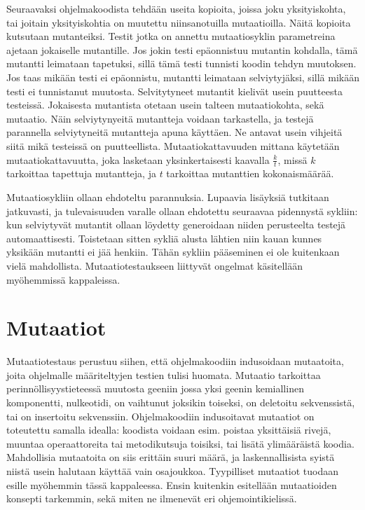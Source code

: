 \documentclass{tktltiki}
\begin{document}
Seuraavaksi ohjelmakoodista tehdään useita kopioita, joissa joku yksityiskohta, tai joitain yksityiskohtia on muutettu niinsanotuilla mutaatioilla. Näitä kopioita kutsutaan mutanteiksi. Testit jotka on annettu mutaatiosyklin parametreina ajetaan jokaiselle mutantille. Jos jokin testi epäonnistuu mutantin kohdalla, tämä mutantti leimataan tapetuksi, sillä tämä testi tunnisti koodin tehdyn muutoksen. Jos taas mikään testi ei epäonnistu, mutantti leimataan selviytyjäksi, sillä mikään testi ei tunnistanut muutosta. Selvitytyneet mutantit kielivät usein puutteesta testeissä. Jokaisesta mutantista otetaan usein talteen mutaatiokohta, sekä mutaatio. Näin selviytynyeitä mutantteja voidaan tarkastella, ja testejä parannella selviytyneitä mutantteja apuna käyttäen. Ne antavat usein vihjeitä siitä mikä testeissä on puutteellista. Mutaatiokattavuuden mittana käytetään mutaatiokattavuutta, joka lasketaan yksinkertaisesti kaavalla $\frac{k}{t}$, missä $k$ tarkoittaa tapettuja mutantteja, ja $t$ tarkoittaa mutanttien kokonaismäärää.

Mutaatiosykliin ollaan ehdoteltu parannuksia. Lupaavia lisäyksiä tutkitaan jatkuvasti, ja tulevaisuuden varalle ollaan ehdotettu seuraavaa pidennystä sykliin: kun selviytyvät mutantit ollaan löydetty generoidaan niiden perusteelta testejä automaattisesti. Toistetaan sitten sykliä alusta lähtien niin kauan kunnes yksikään mutantti ei jää henkiin. Tähän sykliin pääseminen ei ole kuitenkaan vielä mahdollista. Mutaatiotestaukseen liittyvät ongelmat käsitellään myöhemmissä kappaleissa.

\section{Mutaatiot}
Mutaatiotestaus perustuu siihen, että ohjelmakoodiin indusoidaan mutaatoita, joita ohjelmalle määriteltyjen testien tulisi huomata. Mutaatio tarkoittaa perinnöllisyystieteessä muutosta geeniin jossa yksi geenin kemiallinen komponentti, nulkeotidi, on vaihtunut joksikin toiseksi, on deletoitu sekvenssistä, tai on insertoitu sekvenssiin. Ohjelmakoodiin indusoitavat mutaatiot on toteutettu samalla idealla: koodista voidaan esim. poistaa yksittäisiä rivejä, muuntaa operaattoreita tai metodikutsuja toisiksi, tai lisätä ylimääräistä koodia. Mahdollisia mutaatoita on siis erittäin suuri määrä, ja laskennallisista syistä niistä usein halutaan käyttää vain osajoukkoa. Tyypilliset mutaatiot tuodaan esille myöhemmin tässä kappaleessa. Ensin kuitenkin esitellään mutaatioiden konsepti tarkemmin, sekä miten ne ilmenevät eri ohjemointikielissä.
\end{document}
